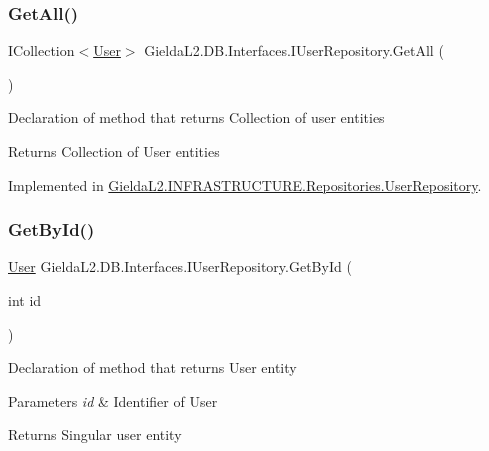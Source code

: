 \subsubsection{\texorpdfstring{GetAll()}{GetAll()}}
{\footnotesize\ttfamily I\+Collection$<$\mbox{\hyperlink{class_gielda_l2_1_1_d_b_1_1_entities_1_1_user}{User}}$>$ Gielda\+L2.\+D\+B.\+Interfaces.\+I\+User\+Repository.\+Get\+All (\begin{DoxyParamCaption}{ }\end{DoxyParamCaption})}



Declaration of method that returns Collection of user entities 

\begin{DoxyReturn}{Returns}
Collection of User entities
\end{DoxyReturn}


Implemented in \mbox{\hyperlink{class_gielda_l2_1_1_i_n_f_r_a_s_t_r_u_c_t_u_r_e_1_1_repositories_1_1_user_repository_ab9a56b5b0dfe9cf6350eebcf751adcfc}{Gielda\+L2.\+I\+N\+F\+R\+A\+S\+T\+R\+U\+C\+T\+U\+R\+E.\+Repositories.\+User\+Repository}}.

\mbox{\label{interface_gielda_l2_1_1_d_b_1_1_interfaces_1_1_i_user_repository_ae3b2e6d986054c6b336887b4d0d1cfac}} 
\subsubsection{\texorpdfstring{GetById()}{GetById()}}
{\footnotesize\ttfamily \mbox{\hyperlink{class_gielda_l2_1_1_d_b_1_1_entities_1_1_user}{User}} Gielda\+L2.\+D\+B.\+Interfaces.\+I\+User\+Repository.\+Get\+By\+Id (\begin{DoxyParamCaption}\item[{int}]{id }\end{DoxyParamCaption})}



Declaration of method that returns User entity 


\begin{DoxyParams}{Parameters}
{\em id} & Identifier of User\\
\hline
\end{DoxyParams}
\begin{DoxyReturn}{Returns}
Singular user entity
\end{DoxyReturn}


